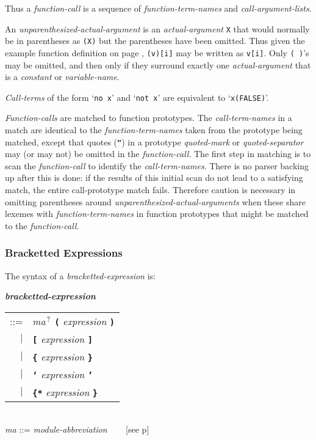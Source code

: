 \documentclass[12pt]{article}
\newcommand{\TT}[1]{{\tt \bfseries #1}}
\newcommand{\QMARK}{{$^{\,\mbox{\footnotesize ?}}$}}
\newcommand{\emkey}[1]{{\em \bfseries #1}}
\newcommand{\pagref}[1]{p\pageref{#1}}
\newenvironment{indpar}[1][0.3in]%
	{\begin{list}{}%
		     {\setlength{\itemsep}{0in}%
		      \setlength{\topsep}{0in}%
		      \setlength{\parsep}{1ex}%
		      \setlength{\labelwidth}{#1}%
		      \setlength{\leftmargin}{#1}%
		      \addtolength{\leftmargin}{\labelsep}}%
	 \item}%
	{\end{list}}
\begin{document}
Thus a {\em function-call} is a sequence of {\em function-term-names}
and {\em call-argument-lists}.

An {\em unparenthesized-actual-argument}\label{UNPARENTHESIZED-ACTUAL-ARGUMENT}
is an {\em actual-argument}
{\tt X} that would normally be in parentheses as {\tt (X)} but the
parentheses have been omitted.  Thus given the example function definition
on page \pageref{REFERENCE-EXPRESSION-FUNCTION-EXAMPLE},
{\tt (v)[i]} may be written as {\tt v[i]}.  Only {\tt (~)}'s may be
omitted, and then only if they surround exactly one {\em actual-argument}
that is a {\em constant} or {\em variable-name}.

{\em Call-terms} of the form `{\tt no x}' and `{\tt not x}' are
equivalent to `{\tt x(FALSE)}'.

{\em Function-calls} are matched to function prototypes.  The
{\em call-term-names} in a match are identical to the
{\em function-term-names} taken from the prototype being matched, except
that quotes (\TT{"}) in a prototype {\em quoted-mark} or
{\em quoted-separator} may (or may not) be omitted in the
{\em function-call}.  The first
step in matching is to scan the {\em function-call} to identify the
{\em call-term-names}.  There is no parser backing up after this is
done: if the results of this initial scan do not lead to a satisfying
match, the entire call-prototype match fails.  Therefore caution
is necessary in omitting parentheses around
{\em unparenthesized-actual-arguments} when these share lexemes with
{\em function-term-names} in function prototypes that might be
matched to the {\em function-call}.

\subsubsection{Bracketted Expressions}
\label{BRACKETTED-EXPRESSIONS}

The syntax of a {\em bracketted-expression} is:

\begin{indpar}
\emkey{bracketted-expression}\label{BRACKETTED-EXPRESSION}
    \begin{tabular}[t]{@{}rl}
    ::= & {\em ma}\QMARK{} \TT{(} {\em expression} \TT{)} \\
    $|$ & \TT{[} {\em expression} \TT{]} \\
    $|$ & \TT{\{} {\em expression} \TT{\}} \\
    $|$ & \TT{`} {\em expression} \TT{'} \\
    $|$ & \TT{\{*} {\em expression} \TT{*\}} \\
    \end{tabular}
\\[0.5ex]
{\em ma} ::= {\em module-abbreviation} ~~~ [see \pagref{MODULE-ABBREVIATION}]
\end{indpar}
\end{document}
